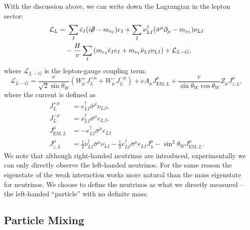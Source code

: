 \documentclass[aps,prb,superscriptaddress,nofootinbib]{revtex4}
\begin{document}
With the discussion above, we can write down the Lagrangian in the lepton sector:
\begin{equation}
\begin{aligned}
	\mathcal L_L =&\ \sum_I \bar e_I (i\cancel\partial-m_{e_I})e_I + \sum_I \nu_{LI}^\dagger (\bar\sigma^\mu \partial_\mu -m_{\nu_I})\nu_{LI} \\
	& -\frac{H}{v} \sum_I \left(m_{e_I} \bar e_I e_I + m_{\nu_I}\bar\nu_{LI}\nu_{LI}\right)+ \mathcal L_{L-G},
\end{aligned}
\end{equation}
where $\mathcal L_{L-G}$ is the lepton-gauge coupling term:
\begin{equation}
	\mathcal L_{L-G} = \frac{e}{\sqrt{2}\sin{\theta_W}}\left(W^{+}_\mu J_L^{+\mu} + W^{-}_\mu J_L^{-\mu} \right) + e A_\mu J^{\mu}_{\mathrm{EM},L} + \frac{e}{\sin{\theta_W}\cos{\theta_W}} Z_\mu J^\mu_{z,L},
\end{equation}
where the current is defined as 
\begin{equation}
\begin{aligned}
	J^{+\mu}_L &= e_{LI}^\dagger \bar\sigma^\mu \nu_{LJ}, \\
	J^{-\mu}_L &= \nu_{LI}^\dagger \bar\sigma^\mu e_{LJ}, \\
	J^\mu_{\mathrm{EM},L} &= - e_{LI}^\dagger \bar\sigma^\mu e_{LI} \\
	J_{z,L}^\mu &= \frac{1}{2} \nu_{LI}^\dagger \bar\sigma^\mu \nu_{LI} - \frac{1}{2} e_{LI}^\dagger \bar\sigma^\mu e_{LI} J^\mu_3-\sin^2{\theta_W}J_{\mathrm{EM},L}^\mu.
\end{aligned}
\end{equation}
We note that although right-handed neutrinos are introduced, experimentally we can only directly observe the left-handed neutrinos.
For the same reason the eigenstate of the weak interaction works more natural than the mass eigenstate for neutrinos. 
We choose to define the neutrinos as what we directly measured -- the left-handed ``particle'' with no definite mass.



\subsection{Particle Mixing}
\end{document}

